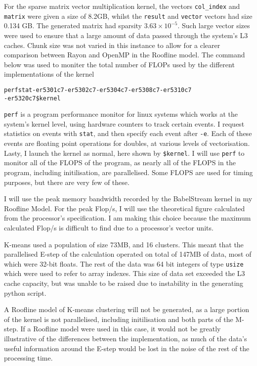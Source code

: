 For the sparse matrix vector multiplication kernel, the vectors \texttt{col\_index} and \texttt{matrix} were given a size of 8.2GB, whilst the \texttt{result} and \texttt{vector} vectors had size 0.134 GB. The generated matrix had sparsity $3.63 \times 10^{-5}$. Such large vector sizes were used to ensure that a large amount of data passed through the system's L3 caches. Chunk size was not varied in this instance to allow for a clearer comparison between Rayon and OpenMP in the Roofline model. The command below was used to moniter the total number of FLOPs used by the different implementations of the kernel

\begin{alltt}
\footnotesize
perf stat -e r5301c7 -e r5302c7 -e r5304c7 -e r5308c7 -e r5310c7 
          -e r5320c7 \$kernel 
\end{alltt}

\texttt{perf} is a program performance monitor for linux systems which works at the system's kernel level, using hardware counters to track certain events. I request statistics on events with \texttt{stat}, and then specify each event after \texttt{-e}. Each of these events are floating point operations for doubles, at various levels of vectorisation. Lasty, I launch the kernel as normal, here shown by \texttt{\$kernel}.
I will use \texttt{perf} to monitor all of the FLOPS of the program, as nearly all of the FLOPS in the program, including initilisation, are parallelised. Some FLOPS are used for timing purposes, but there are very few of these.

I will use the peak memory bandwidth recorded by the BabelStream kernel in my Roofline Model. For the peak Flop/s, I will use the theoretical figure calculated from the processor's specification. I am making this choice because the maximum calculated Flop/s is difficult to find due to a processor's vector units.

K-means used a population of size 73MB, and 16 clusters. This meant that the parallelised E-step of the calculation operated on total of 147MB of data, most of which were 32-bit floats. The rest of the data was 64 bit integers of type \texttt{usize} which were used to refer to array indexes. This size of data set exceeded the L3 cache capacity, but was unable to be raised due to instability in the generating python script.

A Roofline model of K-means clustering will not be generated, as a large portion of the kernel is not parallelised, including initilisation and both parts of the M-step. If a Roofline model were used in this case, it would not be greatly illustrative of the differences between the implementation, as much of the data's useful information around the E-step would be lost in the noise of the rest of the processing time.

